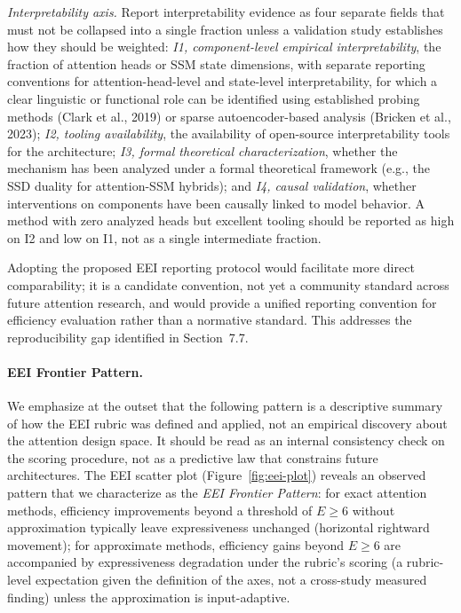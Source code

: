 \documentclass[10pt,twocolumn]{article}
\begin{document}
\noindent\textit{Interpretability axis.} Report interpretability evidence as four separate fields that must not be collapsed into a single fraction unless a validation study establishes how they should be weighted: \textit{I1, component-level empirical interpretability}, the fraction of attention heads or SSM state dimensions, with separate reporting conventions for attention-head-level and state-level interpretability, for which a clear linguistic or functional role can be identified using established probing methods (Clark et al., 2019) or sparse autoencoder-based analysis (Bricken et al., 2023); \textit{I2, tooling availability}, the availability of open-source interpretability tools for the architecture; \textit{I3, formal theoretical characterization}, whether the mechanism has been analyzed under a formal theoretical framework (e.g., the SSD duality for attention-SSM hybrids); and \textit{I4, causal validation}, whether interventions on components have been causally linked to model behavior. A method with zero analyzed heads but excellent tooling should be reported as high on I2 and low on I1, not as a single intermediate fraction.

Adopting the proposed EEI reporting protocol would facilitate more direct comparability; it is a candidate convention, not yet a community standard across future attention research, and would provide a unified reporting convention for efficiency evaluation rather than a normative standard. This addresses the reproducibility gap identified in Section~7.7.

\paragraph{EEI Frontier Pattern.}
We emphasize at the outset that the following pattern is a descriptive summary of how the EEI rubric was defined and applied, not an empirical discovery about the attention design space. It should be read as an internal consistency check on the scoring procedure, not as a predictive law that constrains future architectures. The EEI scatter plot (Figure~\ref{fig:eei-plot}) reveals an observed pattern that we characterize as the \textit{EEI Frontier Pattern}: for exact attention methods, efficiency improvements beyond a threshold of $E \geq 6$ without approximation typically leave expressiveness unchanged (horizontal rightward movement); for approximate methods, efficiency gains beyond $E \geq 6$ are accompanied by expressiveness degradation under the rubric's scoring (a rubric-level expectation given the definition of the axes, not a cross-study measured finding) unless the approximation is input-adaptive.
\end{document}
